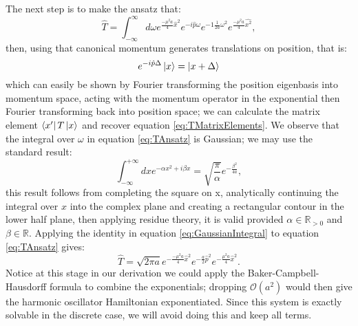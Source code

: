 \documentclass[12pt]{article}
\begin{document}
The next step is to make the ansatz that:
\begin{equation}
	\label{eq:TAnsatz}
	\hat{T} = \int_{-\infty}^{\infty} d\omega e^{\frac{-\mu^2a}{4}\hat{x}^2}e^{-i\hat{p}\omega}e^{-1\frac{1}{2a}\omega^2}e^{\frac{-\mu^2a}{4}\hat{x^2}},
\end{equation}
then, using that canonical momentum generates translations on position, that is:
\begin{equation}
	\label{eq:MomentumTranslation}
	e^{-i\hat{p}\Delta}\ket{x} = \ket{x+\Delta}
\end{equation}
which can easily be shown by Fourier transforming the position eigenbasis into momentum space, acting with the momentum operator in the exponential then Fourier transforming back into position space; we can calculate the matrix element $\bra{x'}T\ket{x}$ and recover equation \ref{eq:TMatrixElements}. We observe that the integral over $\omega$ in equation \ref{eq:TAnsatz} is Gaussian; we may use the standard result:
\begin{equation}
	\label{eq:GaussianIntegral}
	\int_{-\infty}^{+\infty}dx e^{-\alpha x^2 + i\beta x} = \sqrt{\frac{\pi}{\alpha}}e^{-\frac{\beta^2}{4a}},
\end{equation}
this result follows from completing the square on x, analytically continuing the integral over $x$ into the complex plane and creating a rectangular contour in the lower half plane, then applying residue theory, it is valid provided $\alpha \in \mathbb{R}_{>0}$ and $\beta \in \mathbb{R}$. Applying the identity in equation \ref{eq:GaussianIntegral} to equation \ref{eq:TAnsatz} gives:
\begin{equation}
	\label{eq:TClosedForm}
	\hat{T} = \sqrt{2\pi a} e^{-\frac{-\mu^2a}{4}\hat{x}^2}e^{-\frac{a}{2}\hat{p}^2}e^{-\frac{\mu^2a}{4}\hat{x}^2}.
\end{equation}
Notice at this stage in our derivation we could apply the Baker-Campbell-Hausdorff formula to combine the exponentials; dropping $\mathcal{O}\left(a^2\right)$ would then give the harmonic oscillator Hamiltonian exponentiated. Since this system is exactly solvable in the discrete case, we will avoid doing this and keep all terms. 
\end{document}
